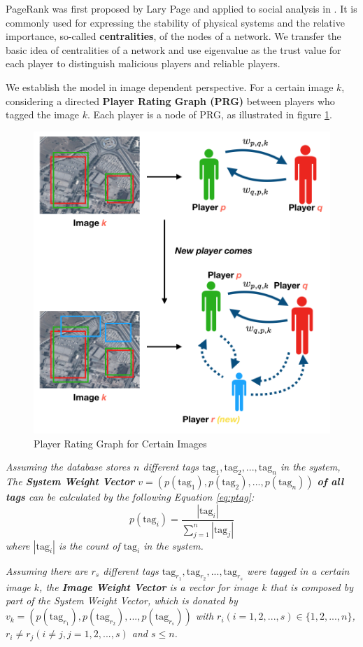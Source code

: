 PageRank was first proposed by Lary Page \cite{page1999pagerank} and 
applied to social analysis in \cite{bonacich2001eigenvector}. 
It is commonly used for expressing the stability of physical systems and the relative importance, 
so-called \textbf{centralities}, of the nodes of a network. 
We transfer the basic idea of centralities of a network
and use eigenvalue as the trust value for each player to distinguish malicious players and reliable players.

We establish the model in image dependent perspective. For a certain image $k$,
considering a directed \textbf{Player Rating Graph (PRG)\label{idx:prg}} 
between players who tagged the image $k$. Each player is a node of PRG, 
as illustrated in figure \ref{fig:graph}. 

\begin{figure}[htp]
\centering
\includegraphics[width=0.5\columnwidth]{figures/graph2}
\caption{Player Rating Graph for Certain Images}
\label{fig:graph}
\end{figure}

\begin{definition}
\label{def:weightv}
\emph{
Assuming the database stores $n$ different tags $\text{tag}_1, \text{tag}_2, ..., \text{tag}_n$ in the system,
The \textbf{System Weight Vector} $v = (p(\text{tag}_1), p(\text{tag}_2), ..., p(\text{tag}_n))$ 
\textbf{of all tags} can be calculated by the following Equation \ref{eq:ptag}:
\begin{equation}
\label{eq:ptag}
p(\text{tag}_i) = \frac{|\text{tag}_i|}{\sum_{j=1}^{n}{|\text{tag}_j|}}
\end{equation}
where  $|\text{tag}_i|$ is the count of $\text{tag}_i$ in the system.
}
\end{definition}
\begin{definition}
\label{def:weightvk}
\emph{
Assuming there are $r_s$ different tags $\text{tag}_{r_1}, \text{tag}_{r_2}, ..., \text{tag}_{r_s}$ were tagged in
a certain image $k$, the \textbf{Image Weight Vector} is a vector for image $k$ that is
composed by part of the System Weight Vector, which 
is donated by $v_k = (p(\text{tag}_{r_1}), p(\text{tag}_{r_2}), ..., p(\text{tag}_{r_s}))$
with $r_i (i=1,2,...,s) \in \{1, 2, ..., n\}$, $r_i \neq r_j (i\neq j, j=1,2,...,s)$ and $s \leq n$.
}
\end{definition}

